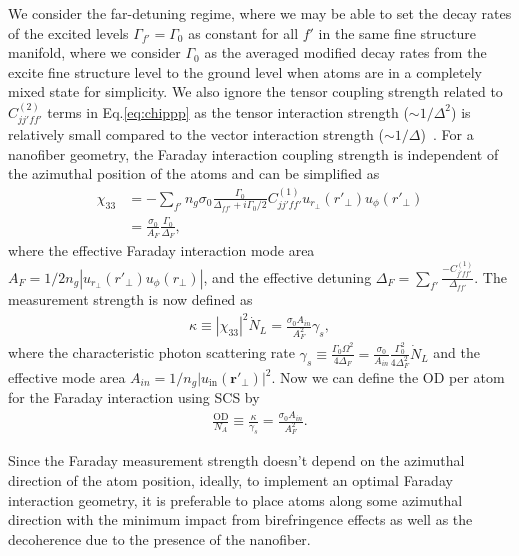 \documentclass[preprint,aps,pra,onecolumn,superscriptaddress]{revtex4-1} %
\def\br{\mathbf{r}}
\begin{document}
We consider the far-detuning regime, where we may be able to set the decay rates of the excited levels $ \Gamma_{f'}= \Gamma_0$ as constant for all $ f' $ in the same fine structure manifold, where we consider $ \Gamma_0 $ as the averaged modified decay rates from the excite fine structure level to the ground level when atoms are in a completely mixed state for simplicity.
We also ignore the tensor coupling strength related to $ C_{jj'ff'}^{(2)} $ terms in Eq.\eqref{eq:chippp} as the tensor interaction strength ($ \sim 1/\Delta^2 $) is relatively small compared to the vector interaction strength ($ \sim 1/\Delta $)~\cite{Deutsch2010a}. 
For a nanofiber geometry, the Faraday interaction coupling strength is independent of the azimuthal position of the atoms and can be simplified as
\begin{align}
\chi_{33} &= -\sum_{f'}n_g\sigma_0\frac{\Gamma_0}{\Delta_{ff'}+i\Gamma_0/2}C_{jj'ff'}^{(1)}u_{r\!_\perp}(r'\!_\perp)u_\phi(r'\!_\perp)\\
&=\frac{\sigma_0}{A_F}\frac{\Gamma_0}{\Delta_F},
\end{align}
where the effective Faraday interaction mode area $ A_F=1/2n_g|u_{r\!_\perp}(r'\!_\perp)u_\phi(r\!_\perp)| $, and the effective detuning $ \Delta_F=\sum_{f'}\frac{-C_{j'ff'}^{(1)}}{\Delta_{ff'}} $.
The measurement strength is now defined as
\begin{align}
\kappa\equiv|\chi_{33}|^2\dot{N}_L=\frac{\sigma_0A_{in}}{A_F^2}\gamma_s,
\end{align}
where the characteristic photon scattering rate $ \gamma_s\equiv \frac{\Gamma_0\Omega^2}{4\Delta_F}=\frac{\sigma_0}{A_{in}}\frac{\Gamma_0^2}{4\Delta_F^2}\dot{N}_L $ and the effective mode area $ A_{in}=1/n_g|u_{\mathrm{in}}(\br'\!_\perp)|^2 $.
Now we can define the OD per atom for the Faraday interaction using SCS by
\begin{align}
\frac{\mathrm{OD}}{N_A} \equiv \frac{\kappa}{\gamma_s}=\frac{\sigma_0A_{in}}{A_F^2}.
\end{align}

Since the Faraday measurement strength doesn't depend on the azimuthal direction of the atom position, ideally, to implement an optimal Faraday interaction geometry, it is preferable to place atoms along some azimuthal direction with the minimum impact from birefringence effects as well as the decoherence due to the presence of the nanofiber. 
\end{document}
